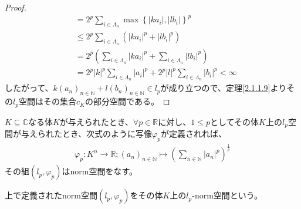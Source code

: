 \documentclass[dvipdfmx]{jsarticle}
\begin{document}
\begin{proof}
\begin{align*}
&= 2^{p}\sum_{i \in \varLambda_{n}} {\max\left\{ \left| ka_{i} \right|,\left| lb_{i} \right| \right\}}^{p}\\
&\leq 2^{p}\sum_{i \in \varLambda_{n}} \left( \left| ka_{i} \right|^{p} + \left| lb_{i} \right|^{p} \right)\\
&= 2^{p}\left( \sum_{i \in \varLambda_{n}} \left| ka_{i} \right|^{p} + \sum_{i \in \varLambda_{n}} \left| lb_{i} \right|^{p} \right)\\
&= 2^{p}|k|^{p}\sum_{i \in \varLambda_{n}} \left| a_{i} \right|^{p} + 2^{p}|l|^{p}\sum_{i \in \varLambda_{n}} \left| b_{i} \right|^{p} < \infty
\end{align*}
したがって、$k\left( a_{n} \right)_{n \in \mathbb{N}} + l\left( b_{n} \right)_{n \in \mathbb{N}} \in l_{p}$が成り立つので、定理\ref{2.1.1.9}よりその$l_{p}$空間はその集合$c_{K}$の部分空間である。
\end{proof}
\begin{thm}\label{2.3.3.4}
$K \subseteq \mathbb{C}$なる体$K$が与えられたとき、$\forall p \in \mathbb{R}$に対し、$1 \leq p$としてその体$K$上の$l_{p}$空間が与えられたとき、次式のように写像$\varphi_{p}$が定義されれば、
\begin{align*}
\varphi_{p}:K^{n} \rightarrow \mathbb{R};\left( a_{n} \right)_{n \in \mathbb{N}} \mapsto \left( \sum_{n \in \mathbb{N}} \left| a_{n} \right|^{p} \right)^{\frac{1}{p}}
\end{align*}
その組$\left( l_{p},\varphi_{p} \right)$はnorm空間をなす。
\end{thm}
\begin{dfn}
上で定義されたnorm空間$\left( l_{p},\varphi_{p} \right)$をその体$K$上の$l_{p}$-norm空間という。
\end{dfn}
\end{document}
